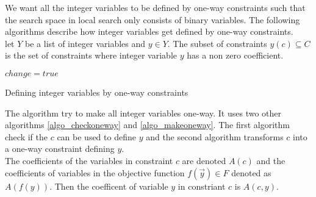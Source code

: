We want all the integer variables to be defined by one-way constraints such that the search space in local search only 
consists of binary variables. The following algorithms describe how integer variables get defined by one-way 
constraints. \\ 
let $Y$ be a list of integer variables and $y \in Y$. The subset of constraints $y(c) \subseteq C$ is the set 
of constraints where integer variable $y$ has a non zero coefficient. \\ 
\IncMargin{1em}
\begin{algorithm}[H]

\algdata 
{}
\BlankLine
\Bool $change = true$\;
\caption{Defining integer variables by one-way constraints}\label{algo_defintvar}
\end{algorithm}\DecMargin{1em}
\noindent
The algorithm try to make all integer variables one-way. It uses two other algorithms 
\ref{algo_checkoneway} and \ref{algo_makeoneway}. The first algorithm check if the 
\cons $c$ can be used to define \var $y$ and the second algorithm transforms $c$ into a one-way constraint defining 
$y$.  \\ 
The coefficients of the variables in constraint $c$ are denoted $A(c)$ and the coefficients of variables in the 
objective function $f(\vec{y}) \in F$ denoted as $A(f(y))$.   Then the 
coefficent of variable $y$ in constriant $c$ is $A(c,y)$. \\  

